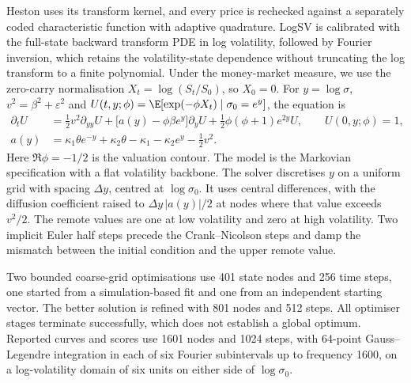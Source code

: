 Heston uses its transform kernel, and every price is rechecked against a separately
coded characteristic function with adaptive quadrature. LogSV is calibrated with
the full-state backward transform PDE in log volatility, followed by Fourier
inversion, which retains the volatility-state dependence without truncating the
log transform to a finite polynomial.
Under the money-market measure, we use the
zero-carry normalisation $X_t=\log(S_t/S_0)$, so $X_0=0$.
For $y=\log\sigma$, $v^2=\beta^2+\varepsilon^2$ and
$U(t,y;\phi)=\E[\exp(-\phi X_t)\mid\sigma_0=e^y]$, the equation is
\begin{align}
 \partial_t U &= \tfrac12v^2\partial_{yy}U
   +\bigl[a(y)-\phi\beta e^y\bigr]\partial_yU
   +\tfrac12\phi(\phi+1)e^{2y}U, \qquad U(0,y;\phi)=1,
   \label{eq:oca-transform-pde}\\
 a(y)&=\kappa_1\theta e^{-y}+\kappa_2\theta-\kappa_1
       -\kappa_2e^y-\tfrac12v^2.\nonumber
\end{align}
Here $\Re\phi=-1/2$ is the valuation contour. The model is the Markovian specification
with a flat volatility backbone.
The solver discretises $y$ on a uniform grid with spacing $\Delta y$, centred at
$\log\sigma_0$. It uses central differences, with the diffusion coefficient raised to
$\Delta y\,|a(y)|/2$ at nodes where that value exceeds $v^2/2$. The remote values are one at low volatility and zero at high
volatility. Two implicit Euler half steps precede the Crank--Nicolson steps and damp the
mismatch between the initial condition and the upper remote value.

Two bounded coarse-grid optimisations use 401 state nodes and 256 time steps, one
started from a simulation-based fit and one from an independent starting
vector. The better solution is refined with 801 nodes and 512 steps. All optimiser
stages terminate successfully, which does not establish a global optimum. Reported
curves and scores use 1601 nodes and 1024 steps, with 64-point Gauss--Legendre
integration in each of six Fourier subintervals up to frequency 1600, on a
log-volatility domain of six units on either side of $\log\sigma_0$.

